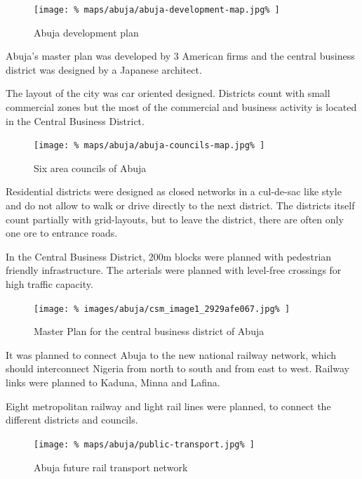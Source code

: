 \documentclass[twocolumn]{article}
\begin{document}
			\begin{figure}[H]
				\texttt{[image: \%
					maps/abuja/abuja-development-map.jpg\%
				]}
				\caption{Abuja development plan\cite{NairalandForum:AbujaMap}}
				\label{fig:map:abuja-development-plan}
			\end{figure}
			
			Abuja's master plan was developed by 3 American firms and the central business district was designed by a Japanese architect.
			
			The layout of the city was car oriented designed. Districts count with small commercial zones but the most of the commercial and business activity is located in the Central Business District.
			
			\begin{figure}[H]
				\texttt{[image: \%
					maps/abuja/abuja-councils-map.jpg\%
				]}
				\caption{Six area councils of Abuja\cite{ResearchGate:SixCouncils}}
				\label{fig:map:abuja-six-area-councils}
			\end{figure}
			
			Residential districts were designed as closed networks in a cul-de-sac like style and do not allow to walk or drive directly to the next district. The districts itself count partially with grid-layouts, but to leave the district, there are often only one ore to entrance roads.
			
			In the Central Business District, 200m blocks were planned with pedestrian friendly infrastructure.
			The arterials were planned with level-free crossings for high traffic capacity.
			
			\begin{figure}[H]
				\texttt{[image: \%
					images/abuja/csm\_image1\_2929afe067.jpg\%
				]}
				\caption{Master Plan for the central business district of Abuja\cite{ASplusP:MasterPlanReview}}
				\label{fig:map:abuja-master-plan-cbd}
			\end{figure}	
			
			It was planned to connect Abuja to the new national railway network, which should interconnect Nigeria from north to south and from east to west.
			Railway links were planned to Kaduna, Minna and Lafina.
			
			Eight metropolitan railway and light rail lines were planned, to connect the different districts and councils. 
			
			\begin{figure}[H]
				\texttt{[image: \%
					maps/abuja/public-transport.jpg\%
				]}
				\caption{Abuja future rail transport network\cite{ASplusP:AbujaTransportationConcept}}
				\label{fig:map:abuja-future-rail-network}
			\end{figure}	
			
\end{document}
